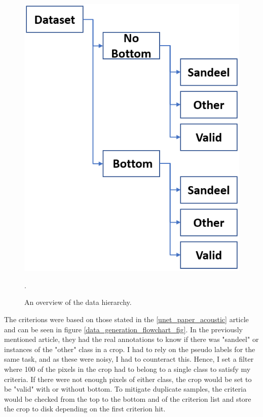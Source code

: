         
        \clearpage
        \begin{figure}[H]
            \centering
            \includegraphics[scale=0.5]{figures/data_hierarki.png}
            \caption{An overview of the data hierarchy.}.
          	\medskip 
            \label{data_hierarchy_fig}
        \end{figure}
        
        The criterions were based on those stated in the \ref{unet_paper_acoustic} article and can be seen in figure \ref{data_generation_flowchart_fig}. In the previously mentioned article, they had the real annotations to know if there was "sandeel" or instances of the "other" class in a crop. I had to rely on the pseudo labels for the same task, and as these were noisy, I had to counteract this. Hence, I set a filter where 100 of the pixels in the crop had to belong to a single class to satisfy my criteria. If there were not enough pixels of either class, the crop would be set to be "valid" with or without bottom. To mitigate duplicate samples, the criteria would be checked from the top to the bottom and of the criterion list and store the crop to disk depending on the first criterion hit.
        
